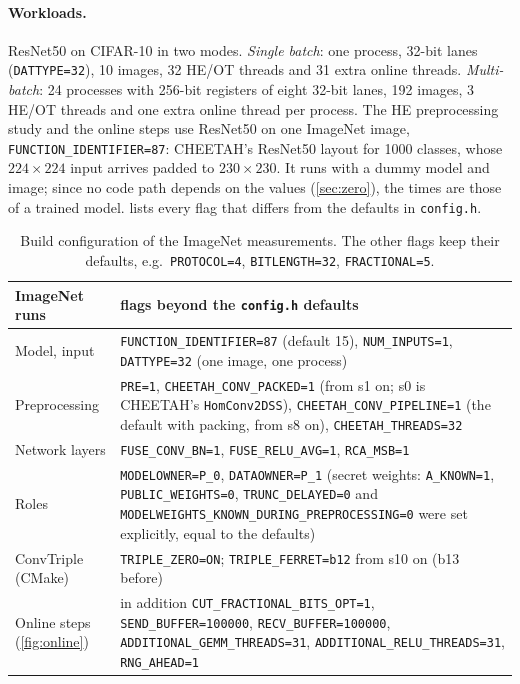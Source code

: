 \documentclass[10pt,a4paper]{article}
\newcommand{\flag}[1]{\nolinkurl{#1}}
\begin{document}
\paragraph{Workloads.} ResNet50 on CIFAR-10 in two modes. \emph{Single batch}: one process,
32-bit lanes (\flag{DATTYPE=32}), 10 images, 32 HE/OT threads and 31 extra online threads.
\emph{Multi-batch}: 24 processes with 256-bit registers of eight 32-bit lanes, 192 images, 3 HE/OT
threads and one extra online thread per process. The HE preprocessing study and the online steps use ResNet50 on one
ImageNet image, \flag{FUNCTION_IDENTIFIER=87}: CHEETAH's ResNet50 layout for 1000 classes, whose $224\times224$ input
arrives padded to $230\times230$. It runs with a dummy model and image; since no code path depends on the values
(\cref{sec:zero}), the times are those of a trained model.  lists every flag that differs from the
defaults in \texttt{config.h}.

\begin{table}[t]
\centering\small
\begin{tabularx}{\linewidth}{@{}lX@{}}
\toprule
ImageNet runs & flags beyond the \texttt{config.h} defaults\\
\midrule
Model, input & \flag{FUNCTION_IDENTIFIER=87} (default 15), \flag{NUM_INPUTS=1}, \flag{DATTYPE=32} (one image, one process)\\
Preprocessing & \flag{PRE=1}, \flag{CHEETAH_CONV_PACKED=1} (from s1 on; s0 is CHEETAH's \texttt{HomConv2DSS}),
  \flag{CHEETAH_CONV_PIPELINE=1} (the default with packing, from s8 on), \flag{CHEETAH_THREADS=32}\\
Network layers & \flag{FUSE_CONV_BN=1}, \flag{FUSE_RELU_AVG=1}, \flag{RCA_MSB=1}\\
Roles & \flag{MODELOWNER=P_0}, \flag{DATAOWNER=P_1} (secret weights: \flag{A_KNOWN=1}, \flag{PUBLIC_WEIGHTS=0},
  \flag{TRUNC_DELAYED=0} and \flag{MODELWEIGHTS_KNOWN_DURING_PREPROCESSING=0} were set explicitly, equal to the defaults)\\
ConvTriple (CMake) & \flag{TRIPLE_ZERO=ON}; \flag{TRIPLE_FERRET=b12} from s10 on (b13 before)\\
Online steps (\cref{fig:online}) & in addition \flag{CUT_FRACTIONAL_BITS_OPT=1}, \flag{SEND_BUFFER=100000},
  \flag{RECV_BUFFER=100000}, \flag{ADDITIONAL_GEMM_THREADS=31}, \flag{ADDITIONAL_RELU_THREADS=31}, \flag{RNG_AHEAD=1}\\
\bottomrule
\end{tabularx}
\caption{Build configuration of the ImageNet measurements. The other flags keep their defaults, e.g.\
\flag{PROTOCOL=4}, \flag{BITLENGTH=32}, \flag{FRACTIONAL=5}.}
\label{tab:imagenet}
\end{table}
\end{document}
